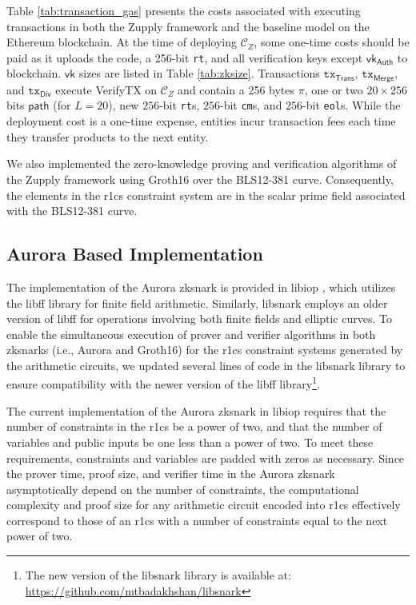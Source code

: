 Table \ref{tab:transaction_gas} presents the costs associated with executing transactions in both the Zupply framework and the baseline model on the Ethereum blockchain. 
At the time of deploying $\mathcal{C}_Z$, some one-time costs should be paid as it uploads the code, a 256-bit \texttt{rt}, and all verification keys except $\mathsf{vk}_\mathsf{Auth}$ to blockchain. $\mathsf{vk}$ sizes are listed in Table \ref{tab:zksize}.  Transactions $\texttt{tx}_\mathsf{Trans}$, $\texttt{tx}_\mathsf{Merge}$, and $\texttt{tx}_\mathsf{Div}$ execute \textsf{VerifyTX} on  $\mathcal{C}_Z$ and contain a 256 bytes $\pi$, one or two $20 \times 256$ bits $\mathsf{path}$ (for $L=20$), new $256$-bit \texttt{rt}s,  $256$-bit \texttt{cm}s, and $256$-bit \texttt{eol}s. 
While the deployment cost is a one-time expense, entities incur transaction fees each time they transfer products to the next entity. 

We also implemented the zero-knowledge proving and verification algorithms of the Zupply framework using Groth16 over the BLS12-381 curve. Consequently, the elements in the \gls{r1cs} constraint system are in the scalar prime field associated with the BLS12-381 curve.

\subsection{Aurora Based Implementation}
\label{sec:aurora-based-Implementation}
The implementation of the Aurora \gls{zksnark} is provided in libiop \cite{libiop}, which utilizes the libff \cite{libff} library for finite field arithmetic. Similarly, libsnark employs an older version of libff for operations involving both finite fields and elliptic curves. To enable the simultaneous execution of prover and verifier algorithms in both \glspl{zksnark} (i.e., Aurora and Groth16) for the \gls{r1cs} constraint systems generated by the arithmetic circuits, we updated several lines of code in the libsnark library to ensure compatibility with the newer version of the libff library\footnote{The new version of the libsnark library is available at: \url{https://github.com/mtbadakhshan/libsnark}}.

The current implementation of the Aurora \gls{zksnark} in libiop \cite{libiop} requires that the number of constraints in the \gls{r1cs} be a power of two, and that the number of variables and public inputs be one less than a power of two. To meet these requirements, constraints and variables are padded with zeros as necessary. Since the prover time, proof size, and verifier time in the Aurora \gls{zksnark} asymptotically depend on the number of constraints, the computational complexity and proof size for any arithmetic circuit encoded into \gls{r1cs} effectively correspond to those of an \gls{r1cs} with a number of constraints equal to the next power of two. 


